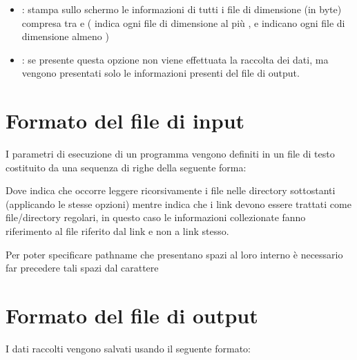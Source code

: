\documentclass[letterpaper,10pt,italian,openany,oneside]{sphinxmanual}
\begin{document}
\begin{itemize}
\item {} 
: stampa sullo schermo le informazioni di tutti i file di dimensione (in byte) compresa tra  e  ( indica ogni file di dimensione al più ,  e  indicano ogni file di dimensione almeno )

\item {} 
: se presente questa opzione non viene effettuata la raccolta dei dati, ma vengono presentati solo le informazioni presenti del file di output.

\end{itemize}


\section{Formato del file di input}
\label{\detokenize{introduzione:formato-del-file-di-input}}
I parametri di esecuzione di un programma vengono definiti in un file di testo costituito da una sequenza di righe della seguente forma:

\begin{sphinxVerbatim}[commandchars=\\\{\}]
 \PYG{p}{[}\PYG{p}{]} \PYG{p}{[}\PYG{p}{]}
\end{sphinxVerbatim}

Dove  indica che occorre leggere ricorsivamente i file nelle directory sottostanti (applicando le stesse opzioni) mentre  indica che i link devono essere trattati come file/directory regolari, in questo caso le informazioni collezionate fanno riferimento al file riferito dal link e non a link stesso.

Per poter specificare pathname che presentano spazi al loro interno è necessario far precedere tali spazi dal carattere \sphinxcode{\sphinxupquote{\textbackslash{}}}


\section{Formato del file di output}
\label{\detokenize{introduzione:formato-del-file-di-output}}
I dati raccolti vengono salvati usando il seguente formato:
\end{document}
